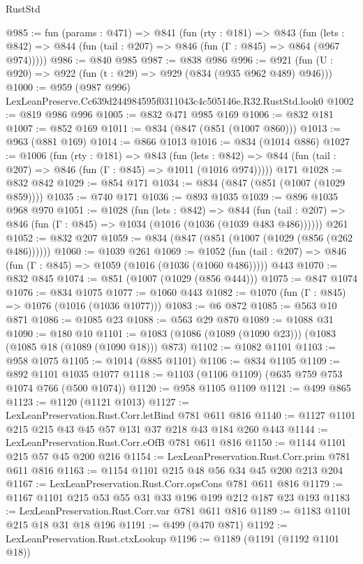 \begin{lexlean}{RustStd}
\begin{coremodule}
@985 := fun (params : @471) =>
  @841
    (fun (rty : @181) =>
    @843
      (fun (lets : @842) => @844 (fun (tail : @207) => @846 (fun (Γ : @845) => @864 (@967 @974)))))
@986 := @840 @985
@987 := @838 @986
@996 := @921 (fun (U : @920) => @922 (fun (t : @29) => @929 (@834 (@935 @962 @489) @946)))
@1000 := @959 (@987 @996) LexLeanPreserve.Cc639d244984595f0311043c4c505146e.R32.RustStd.look0
@1002 := @819 @986 @996
@1005 := @832 @471 @985 @169
@1006 := @832 @181
@1007 := @852 @169
@1011 := @834 (@847 (@851 (@1007 @860)))
@1013 := @963 (@881 @169)
@1014 := @866 @1013
@1016 := @834 (@1014 @886)
@1027 := @1006
    (fun (rty : @181) =>
    @843
      (fun (lets : @842) =>
      @844 (fun (tail : @207) => @846 (fun (Γ : @845) => @1011 (@1016 @974)))))
    @171
@1028 := @832 @842
@1029 := @854 @171
@1034 := @834 (@847 (@851 (@1007 (@1029 @859))))
@1035 := @740 @171
@1036 := @893 @1035
@1039 := @896 @1035 @968 @970
@1051 := @1028
    (fun (lets : @842) =>
    @844 (fun (tail : @207) => @846 (fun (Γ : @845) => @1034 (@1016 (@1036 (@1039 @483 @486))))))
    @261
@1052 := @832 @207
@1059 := @834 (@847 (@851 (@1007 (@1029 (@856 (@262 @486))))))
@1060 := @1039 @261
@1069 := @1052
    (fun (tail : @207) => @846 (fun (Γ : @845) => @1059 (@1016 (@1036 (@1060 @486)))))
    @443
@1070 := @832 @845
@1074 := @851 (@1007 (@1029 (@856 @444)))
@1075 := @847 @1074
@1076 := @834 @1075
@1077 := @1060 @443
@1082 := @1070 (fun (Γ : @845) => @1076 (@1016 (@1036 @1077)))
@1083 := @6 @872
@1085 := @563 @10 @871
@1086 := @1085 @23
@1088 := @563 @29 @870
@1089 := @1088 @31
@1090 := @180 @10
@1101 := @1083 (@1086 (@1089 (@1090 @23))) (@1083 (@1085 @18 (@1089 (@1090 @18))) @873)
@1102 := @1082 @1101
@1103 := @958 @1075
@1105 := @1014 (@885 @1101)
@1106 := @834 @1105
@1109 := @892 @1101 @1035 @1077
@1118 := @1103 (@1106 @1109) (@635 @759 @753 @1074 @766 (@500 @1074))
@1120 := @958 @1105 @1109
@1121 := @499 @865
@1123 := @1120 (@1121 @1013)
@1127 := LexLeanPreservation.Rust.Corr.letBind @781 @611 @816
@1140 := @1127 @1101 @215 @215 @43 @45 @57 @131 @37 @218 @43 @184 @260 @443
@1144 := LexLeanPreservation.Rust.Corr.eOfB @781 @611 @816
@1150 := @1144 @1101 @215 @57 @45 @200 @216
@1154 := LexLeanPreservation.Rust.Corr.prim @781 @611 @816
@1163 := @1154 @1101 @215 @48 @56 @34 @45 @200 @213 @204
@1167 := LexLeanPreservation.Rust.Corr.opsCons @781 @611 @816
@1179 := @1167 @1101 @215 @53 @55 @31 @33 @196 @199 @212 @187 @23 @193
@1183 := LexLeanPreservation.Rust.Corr.var @781 @611 @816
@1189 := @1183 @1101 @215 @18 @31 @18 @196
@1191 := @499 (@470 @871)
@1192 := LexLeanPreservation.Rust.ctxLookup
@1196 := @1189 (@1191 (@1192 @1101 @18))

\end{coremodule}
\end{lexlean}

